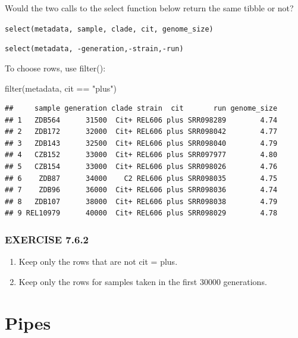 \documentclass[
]{book}
\newenvironment{Shaded}{\begin{snugshade}}{\end{snugshade}}
\newcommand{\FunctionTok}[1]{\textcolor[rgb]{0.00,0.00,0.00}{#1}}
\newcommand{\NormalTok}[1]{#1}
\newcommand{\SpecialCharTok}[1]{\textcolor[rgb]{0.00,0.00,0.00}{#1}}
\newcommand{\StringTok}[1]{\textcolor[rgb]{0.31,0.60,0.02}{#1}}
\providecommand{\tightlist}{%
  \setlength{\itemsep}{0pt}\setlength{\parskip}{0pt}}
\begin{document}
Would the two calls to the select function below return the same tibble or not?

\texttt{select(metadata,\ sample,\ clade,\ cit,\ genome\_size)}

\texttt{select(metadata,\ -generation,-strain,-run)}

To choose rows, use filter():

\begin{Shaded}
\begin{Highlighting}[]
\FunctionTok{filter}\NormalTok{(metadata, cit }\SpecialCharTok{==} \StringTok{"plus"}\NormalTok{)}
\end{Highlighting}
\end{Shaded}

\begin{verbatim}
##     sample generation clade strain  cit       run genome_size
## 1   ZDB564      31500  Cit+ REL606 plus SRR098289        4.74
## 2   ZDB172      32000  Cit+ REL606 plus SRR098042        4.77
## 3   ZDB143      32500  Cit+ REL606 plus SRR098040        4.79
## 4   CZB152      33000  Cit+ REL606 plus SRR097977        4.80
## 5   CZB154      33000  Cit+ REL606 plus SRR098026        4.76
## 6    ZDB87      34000    C2 REL606 plus SRR098035        4.75
## 7    ZDB96      36000  Cit+ REL606 plus SRR098036        4.74
## 8   ZDB107      38000  Cit+ REL606 plus SRR098038        4.79
## 9 REL10979      40000  Cit+ REL606 plus SRR098029        4.78
\end{verbatim}

\hypertarget{exercise-7.6.2}{%
\subsubsection*{EXERCISE 7.6.2}\label{exercise-7.6.2}}

\begin{enumerate}
\def\labelenumi{\arabic{enumi}.}
\tightlist
\item
  Keep only the rows that are not cit = plus.
\item
  Keep only the rows for samples taken in the first 30000 generations.
\end{enumerate}

\hypertarget{pipes}{%
\section{Pipes}\label{pipes}}
\end{document}

